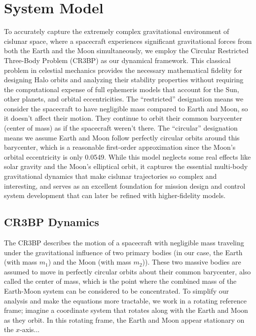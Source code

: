 \documentclass[10pt,letterpaper]{article}
\begin{document}
\section{System Model}

To accurately capture the extremely complex gravitational environment of cislunar space, where a spacecraft experiences significant gravitational forces from both the Earth and the Moon simultaneously, we employ the Circular Restricted Three-Body Problem (CR3BP) as our dynamical framework. This classical problem in celestial mechanics provides the necessary mathematical fidelity for designing Halo orbits and analyzing their stability properties without requiring the computational expense of full ephemeris models that account for the Sun, other planets, and orbital eccentricities. The ``restricted'' designation means we consider the spacecraft to have negligible mass compared to Earth and Moon, so it doesn't affect their motion. They continue to orbit their common barycenter (center of mass) as if the spacecraft weren't there. The ``circular'' designation means we assume Earth and Moon follow perfectly circular orbits around this barycenter, which is a reasonable first-order approximation since the Moon's orbital eccentricity is only 0.0549. While this model neglects some real effects like solar gravity and the Moon's elliptical orbit, it captures the essential multi-body gravitational dynamics that make cislunar trajectories so complex and interesting, and serves as an excellent foundation for mission design and control system development that can later be refined with higher-fidelity models.

\subsection{CR3BP Dynamics}
The CR3BP describes the motion of a spacecraft with negligible mass traveling under the gravitational influence of two primary bodies (in our case, the Earth (with mass $m_1$) and the Moon (with mass $m_2$)). These two massive bodies are assumed to move in perfectly circular orbits about their common barycenter, also called the center of mass, which is the point where the combined mass of the Earth-Moon system can be considered to be concentrated. To simplify our analysis and make the equations more tractable, we work in a rotating reference frame; imagine a coordinate system that rotates along with the Earth and Moon as they orbit. In this rotating frame, the Earth and Moon appear stationary on the $x$-axis...
\end{document}
